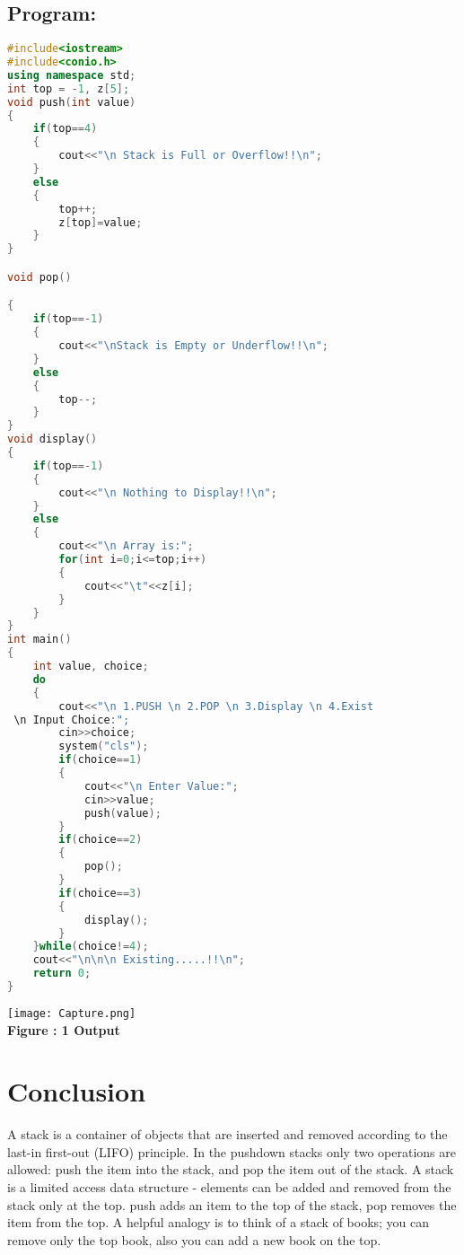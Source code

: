\documentclass[11pt]{article}            %
\begin{document}
\subsection{Program: }     

\begin{lstlisting}[language=c++]
#include<iostream>
#include<conio.h>
using namespace std;
int top = -1, z[5];
void push(int value)
{
	if(top==4)
	{
		cout<<"\n Stack is Full or Overflow!!\n";
	}
	else
	{
		top++;
		z[top]=value;
	}
}

void pop()

{
	if(top==-1)
	{
		cout<<"\nStack is Empty or Underflow!!\n";
	}
	else
	{
		top--;
	}
}
void display()
{
	if(top==-1)
	{
		cout<<"\n Nothing to Display!!\n";
	}
	else
	{
		cout<<"\n Array is:";
		for(int i=0;i<=top;i++)
		{
			cout<<"\t"<<z[i];
		}
	}
}
int main()
{
	int value, choice;
	do
	{
		cout<<"\n 1.PUSH \n 2.POP \n 3.Display \n 4.Exist
 \n Input Choice:";
		cin>>choice;
		system("cls");
		if(choice==1)
		{
			cout<<"\n Enter Value:";
			cin>>value;
			push(value);
		}
		if(choice==2)
		{
			pop();
		}
		if(choice==3)
		{
			display();
		}
	}while(choice!=4);
	cout<<"\n\n\n Existing.....!!\n";
	return 0;
}

\end{lstlisting}

\begin{center}
 \texttt{[image: Capture.png]}\\ 
\textbf{Figure : 1 Output}
\vskip 0.5cm
\end{center}

\section{Conclusion}  
A stack is a container of objects that are inserted and removed according to the last-in first-out (LIFO) principle. In the pushdown stacks only two operations are allowed: push the item into the stack, and pop the item out of the stack. A stack is a limited access data structure - elements can be added and removed from the stack only at the top. push adds an item to the top of the stack, pop removes the item from the top. A helpful analogy is to think of a stack of books; you can remove only the top book, also you can add a new book on the top.


 
\end{document}
